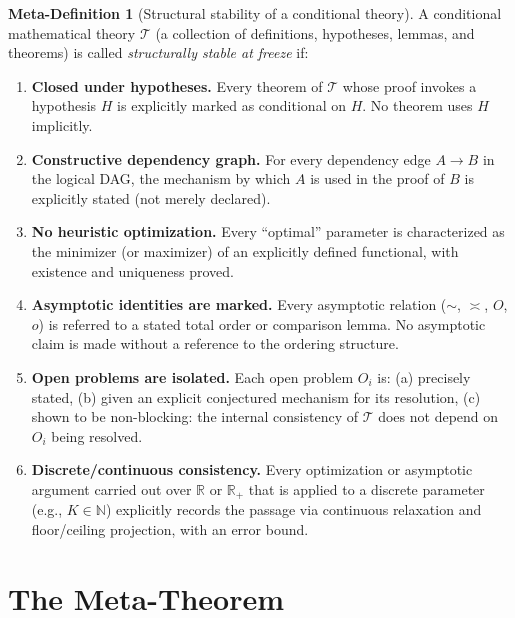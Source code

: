 \documentclass[12pt,a4paper]{amsart}
\theoremstyle{definition}
\newtheorem{metadefinition}[metatheorem]{Meta-Definition}
\newcommand{\R}{\mathbb{R}}
\newcommand{\N}{\mathbb{N}}
\begin{document}
\begin{metadefinition}[Structural stability of a conditional theory]
\label{mdef:stable}
A conditional mathematical theory $\mathcal{T}$
(a collection of definitions, hypotheses, lemmas, and theorems)
is called \emph{structurally stable at freeze} if:
\begin{enumerate}[label=(SS\arabic*),leftmargin=3em]
  \item\label{ss1} \textbf{Closed under hypotheses.}
    Every theorem of $\mathcal{T}$ whose proof invokes a
    hypothesis $H$ is explicitly marked as conditional on $H$.
    No theorem uses $H$ implicitly.

  \item\label{ss2} \textbf{Constructive dependency graph.}
    For every dependency edge $A\to B$ in the logical DAG,
    the mechanism by which $A$ is used in the proof of $B$
    is explicitly stated (not merely declared).

  \item\label{ss3} \textbf{No heuristic optimization.}
    Every ``optimal'' parameter is characterized as the
    minimizer (or maximizer) of an explicitly defined
    functional, with existence and uniqueness proved.

  \item\label{ss4} \textbf{Asymptotic identities are marked.}
    Every asymptotic relation ($\sim$, $\asymp$, $O$, $o$)
    is referred to a stated total order or comparison lemma.
    No asymptotic claim is made without a reference to
    the ordering structure.

  \item\label{ss5} \textbf{Open problems are isolated.}
    Each open problem $O_i$ is:
    (a) precisely stated,
    (b) given an explicit conjectured mechanism for its resolution,
    (c) shown to be non-blocking: the internal consistency of
    $\mathcal{T}$ does not depend on $O_i$ being resolved.

  \item\label{ss6} \textbf{Discrete/continuous consistency.}
    Every optimization or asymptotic argument carried out
    over $\R$ or $\R_+$ that is applied to a discrete
    parameter (e.g., $K\in\N$) explicitly records the
    passage via continuous relaxation and floor/ceiling
    projection, with an error bound.
\end{enumerate}
\end{metadefinition}

\section{The Meta-Theorem}
\label{sec:metatheorem}
\end{document}
